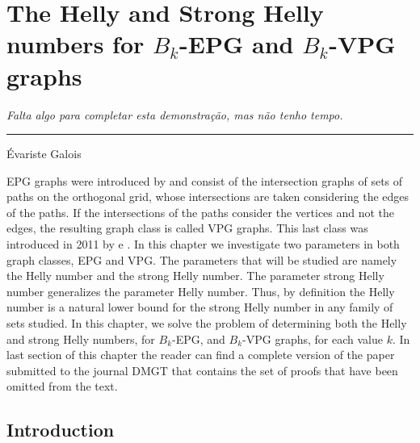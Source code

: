 \chapter{The Helly and Strong Helly numbers for  $B_k$-EPG and $B_k$-VPG graphs}
\label{cap:iv}

\begin{flushright}
\begin{minipage}[t][0cm][b]{0.47\textwidth}
\emph{
Falta algo para completar esta demonstração, mas não tenho tempo.}
\end{minipage}

\rule[0cm]{7cm}{0.03cm}%

Évariste Galois
\end{flushright}


EPG graphs were introduced by \citet{golumbic2009} and consist of the intersection graphs of sets of paths on the orthogonal grid, whose intersections are taken considering the edges of the paths. If the intersections of the paths consider the vertices and not the edges, the resulting graph class is called VPG graphs. This last class was introduced in 2011 by \citet{asinowski2011string} e \citet{asinowski2012}.  In this chapter we investigate two parameters in both graph classes, EPG and VPG. The parameters that will be studied are namely the Helly number and the strong Helly number. The parameter strong Helly number  generalizes the parameter Helly number. Thus, by definition the Helly number is a natural lower bound for the strong Helly number in any family of sets studied. In this chapter, we solve the problem of determining both the Helly and strong Helly numbers, for $B_k$-EPG, and $B_k$-VPG graphs, for each value $k$. In last section of this chapter the reader can find a complete version of the paper submitted to  the journal DMGT that contains the set of proofs that have been omitted from the text.






\section{Introduction}


